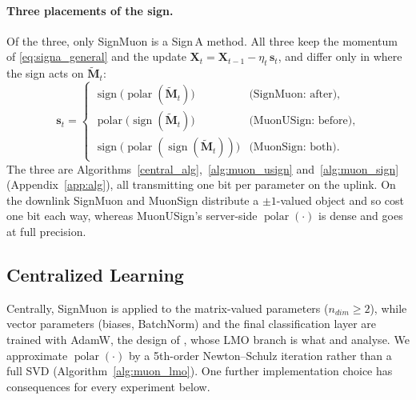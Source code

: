 \paragraph{Three placements of the sign.} Of the three, only SignMuon is a Sign\,A method. All three keep the momentum of \eqref{eq:signa_general} and the update $\mathbf{X}_t=\mathbf{X}_{t-1}-\eta_t\,\mathbf{s}_t$, and differ only in where the sign acts on $\tilde{\mathbf{M}}_t$:
\begin{equation}
\label{eq:three_placements}
\mathbf{s}_t=
\begin{cases}
\operatorname{sign}\!\bigl(\operatorname{polar}(\tilde{\mathbf{M}}_t)\bigr) & \text{(SignMuon: after)},\\[2pt]
\operatorname{polar}\!\bigl(\operatorname{sign}(\tilde{\mathbf{M}}_t)\bigr) & \text{(MuonUSign: before)},\\[2pt]
\operatorname{sign}\!\bigl(\operatorname{polar}(\operatorname{sign}(\tilde{\mathbf{M}}_t))\bigr) & \text{(MuonSign: both)}.
\end{cases}
\end{equation}
The three are Algorithms~\ref{central_alg},~\ref{alg:muon_usign} and~\ref{alg:muon_sign} (Appendix~\ref{app:alg}), all transmitting one bit per parameter on the uplink. On the downlink SignMuon and MuonSign distribute a $\pm1$-valued object and so cost one bit each way, whereas MuonUSign's server-side $\operatorname{polar}(\cdot)$ is dense and goes at full precision.

\subsection{Centralized Learning}
Centrally, SignMuon is applied to the matrix-valued parameters ($n_{dim}\ge 2$), while vector parameters (biases, BatchNorm) and the final classification layer are trained with AdamW, the design of \citet{jordan2024muon}, whose LMO branch is what \citet{li2025note} and \citet{riabinin2025gluon} analyse. We approximate $\operatorname{polar}(\cdot)$ by a 5th-order Newton--Schulz iteration rather than a full SVD (Algorithm~\ref{alg:muon_lmo}). One further implementation choice has consequences for every experiment below.

